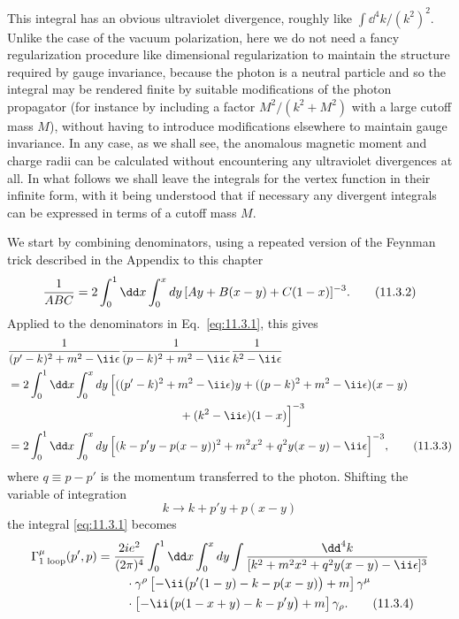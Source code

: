 This integral has an obvious ultraviolet divergence, roughly like
$\int \dd^4k/(k^2)^2$. Unlike the case of the vacuum polarization, here we do
not need a fancy regularization procedure like dimensional regularization to
maintain the structure required by gauge invariance, because the photon is a
neutral particle and so the integral may be rendered finite by suitable
modifications of the photon propagator (for instance by including a factor
$M^2/(k^2+M^2)$ with a large cutoff mass $M$), without having to introduce
modifications elsewhere to maintain gauge invariance. In any case, as we
shall see, the anomalous magnetic moment and charge radii can be calculated
without encountering any ultraviolet divergences at all. In what follows we
shall leave the integrals for the vertex function in their infinite form,
with it being understood that if necessary any divergent integrals can be
expressed in terms of a cutoff mass $M$.

We start by combining denominators, using a repeated version of the Feynman
trick described in the Appendix to this chapter
\begin{equation}
{1\over ABC}=2\int_0^1\dd x\int_0^xdy\,
 [Ay+B(x-y)+C(1-x)]^{-3}.
\tag{11.3.2}\label{eq:11.3.2}
\end{equation}
Applied to the denominators in Eq.~\eqref{eq:11.3.1}, this gives
\begin{align}
&{1\over(p'-k)^2+m^2-\ii\epsilon}
 {1\over(p-k)^2+m^2-\ii\epsilon}{1\over k^2-\ii\epsilon}
\notag\\
&=2\int_0^1\dd x\int_0^xdy\,
 \Bigl[((p'-k)^2+m^2-\ii\epsilon)y
 +((p-k)^2+m^2-\ii\epsilon)(x-y)\notag\\
&\hspace{52mm}+(k^2-\ii\epsilon)(1-x)\Bigr]^{-3}
\notag\\
&=2\int_0^1\dd x\int_0^xdy\,
 \Bigl[(k-p'y-p(x-y))^2+m^2x^2+q^2y(x-y)-\ii\epsilon\Bigr]^{-3},
\tag{11.3.3}\label{eq:11.3.3}
\end{align}
where $q\equiv p-p'$ is the momentum transferred to the photon. Shifting the
variable of integration
\[
k\longrightarrow k+p'y+p(x-y)
\]
the integral \eqref{eq:11.3.1} becomes
\begin{align}
\Gamma^\mu_{\text{1 loop}}(p',p)={}&{2ie^2\over(2\pi)^4}
 \int_0^1\dd x\int_0^xdy\int
 {\dd^4k\over[k^2+m^2x^2+q^2y(x-y)-\ii\epsilon]^3}\notag\\
&\quad\cdot\gamma^\rho
 \left[-\ii\bigl(\sl{p}'(1-y)-\sl{k}-\sl{p}(x-y)\bigr)+m\right]\gamma^\mu
\notag\\
&\quad\cdot
 \left[-\ii\bigl(\sl{p}(1-x+y)-\sl{k}-\sl{p}'y\bigr)+m\right]\gamma_\rho.
\tag{11.3.4}\label{eq:11.3.4}
\end{align}

